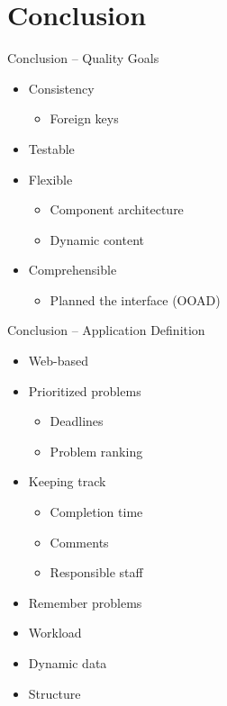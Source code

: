 \section*{Conclusion}
\begin{frame}{Conclusion -- Quality Goals}

\begin{itemize}
	\item Consistency
	\begin{itemize}
		\item Foreign keys
	\end{itemize}
	\item Testable 
	\item Flexible
	\begin{itemize}
		\item Component architecture
		\item Dynamic content
	\end{itemize}
	\item Comprehensible
	\begin{itemize}
		\item Planned the interface (OOAD)
	\end{itemize}
\end{itemize}
\end{frame}

\begin{frame}{Conclusion -- Application Definition}

	\begin{itemize}
	\item Web-based 
	\item Prioritized problems
	\begin{itemize}
		\item Deadlines
		\item Problem ranking
	\end{itemize}
	\item Keeping track
	\begin{itemize}
		\item Completion time
		\item Comments
		\item Responsible staff
	\end{itemize}	
	\item Remember problems
	\item Workload
	\item Dynamic data
	\item Structure
\end{itemize}
\end{frame}